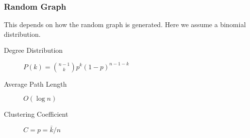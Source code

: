 	\subsubsection{Random Graph} %
	\label{ssub:random_graph}
	This depends on how the random graph is generated.
	Here we assume a binomial distribution.
		\begin{description}
			\item[Degree Distribution] $P(k) = \binom{n-1}{k}p^k(1-p)^{n-1-k}$
			\item[Average Path Length] $O(\log n)$
			\item[Clustering Coefficient] $C = p = \bar{k}/n$
		\end{description}

